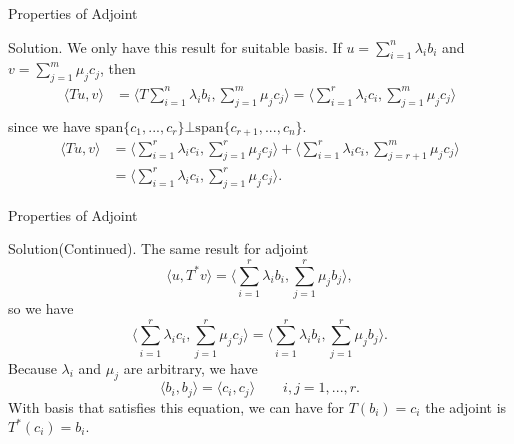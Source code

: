 \documentclass[hyperref={pdfpagelabels=true}]{beamer}
\newcommand{\<}{\langle}
\renewcommand{\>}{\rangle}
\begin{document}
    \begin{frame}{Properties of Adjoint}
        \begin{block}{Solution.}
            We only have this result for suitable basis. If $u = \sum_{i = 1}^{n}\lambda_{i}b_{i}$ and $v = \sum_{j = 1}^{m}\mu_{j}c_{j}$, then 
            \[
                \begin{aligned}
                    \<Tu,v\> &= \<T\sum_{i = 1}^{n}\lambda_{i}b_{i},\sum_{j = 1}^{m}\mu_{j}c_{j}\> = \<\sum_{i = 1}^{r}\lambda_{i}c_{i},\sum_{j = 1}^{m}\mu_{j}c_{j}\> \\
                \end{aligned}
            \]
            since we have $\text{span}\{c_{1},...,c_{r}\} \bot \text{span}\{c_{r+1},...,c_{n}\}$. 
            \[
                \begin{aligned}
                    \<Tu,v\> &= \<\sum_{i = 1}^{r}\lambda_{i}c_{i},\sum_{j = 1}^{r}\mu_{j}c_{j}\>+\<\sum_{i = 1}^{r}\lambda_{i}c_{i},\sum_{j = r+1}^{m}\mu_{j}c_{j}\>\\
                    &=\<\sum_{i = 1}^{r}\lambda_{i}c_{i},\sum_{j = 1}^{r}\mu_{j}c_{j}\>.
                \end{aligned}
            \]
            \end{block}
        \end{frame}
        \begin{frame}{Properties of Adjoint}
            \begin{block}{Solution(Continued).}
            The same result for adjoint
            \[\<u,T^{*}v\> = \<\sum_{i = 1}^{r}\lambda_{i}b_{i},\sum_{j = 1}^{r}\mu_{j}b_{j}\>,\]
            so we have 
            \[\<\sum_{i = 1}^{r}\lambda_{i}c_{i},\sum_{j = 1}^{r}\mu_{j}c_{j}\> = \<\sum_{i = 1}^{r}\lambda_{i}b_{i},\sum_{j = 1}^{r}\mu_{j}b_{j}\>.\]
            Because $\lambda_{i}$ and $\mu_{j}$ are arbitrary, we have 
            \[\<b_{i},b_{j}\> = \<c_{i},c_{j}\> \qquad i,j = 1,...,r.\]
            With basis that satisfies this equation, we can have for $T(b_{i}) = c_{i}$ the adjoint is $T^{*}(c_{i}) = b_{i}.$
        \end{block}
    \end{frame}
\end{document}
